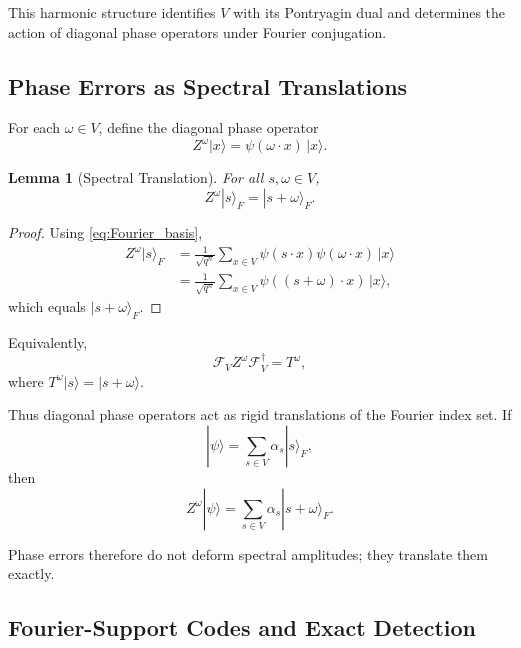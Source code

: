 \documentclass[a4paper,twocolumn,11pt,allowtoday]{quantumarticle}
\theoremstyle{plain}
\newtheorem{lemma}[theorem]{Lemma}
\theoremstyle{definition}
\theoremstyle{remark}
\begin{document}
This harmonic structure identifies $V$ with its Pontryagin dual and determines the action of diagonal phase operators under Fourier conjugation.


\subsection{Phase Errors as Spectral Translations}
\label{subsec:phase_translations}

For each $\omega\in V$, define the diagonal phase operator
\begin{equation}
Z^\omega |x\rangle
=
\psi(\omega\cdot x)\,|x\rangle.
\end{equation}

\begin{lemma}[Spectral Translation]
\label{lem:spectral_translation}
For all $s,\omega\in V$,
\begin{equation}
Z^\omega |s\rangle_F
=
|s+\omega\rangle_F.
\end{equation}
\end{lemma}

\begin{proof}
Using \eqref{eq:Fourier_basis},
\begin{align*}
Z^\omega |s\rangle_F
&=
\frac{1}{\sqrt{q^n}}
\sum_{x\in V}
\psi(s\cdot x)\psi(\omega\cdot x)\,|x\rangle \\
&=
\frac{1}{\sqrt{q^n}}
\sum_{x\in V}
\psi((s+\omega)\cdot x)\,|x\rangle,
\end{align*}
which equals $|s+\omega\rangle_F$.
\end{proof}

Equivalently,
\begin{equation}
\label{eq:conjugation}
\mathcal{F}_V Z^\omega \mathcal{F}_V^\dagger
=
T^\omega,
\end{equation}
where $T^\omega |s\rangle = |s+\omega\rangle$.

Thus diagonal phase operators act as rigid translations of the Fourier index set. 
If
\[
|\psi\rangle
=
\sum_{s\in V} \alpha_s |s\rangle_F,
\]
then
\[
Z^\omega |\psi\rangle
=
\sum_{s\in V} \alpha_s |s+\omega\rangle_F.
\]


Phase errors therefore do not deform spectral amplitudes; they translate them exactly.

\subsection{Fourier-Support Codes and Exact Detection}
\label{subsec:non_collision}
\end{document}
